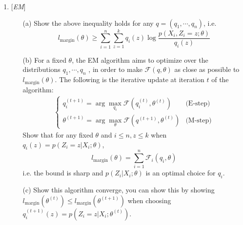 \documentclass[10pt]{article}
\begin{document}
\begin{enumerate}
\item{} {[}\textit{EM}{]}
\begin{itemize}
Let \(Z\) represent the unobserved assignment of a given observation to one of the \(k\) clusters:
\[
Z\sim \text{Categorical}(\pi_1,\cdots,\pi_k)
\]
where \(\pi_k\) is the probability that a randomly selected observation is assigned to cluster \(k\).\\
Let \((X_1, Z_1),\cdots, (X_n, Z_n)\) denote the set of observations and their corresponding cluster assignments, under i.i.d. assumptions.
Consider the marginalized log-likelihood function
\[
l_{\text{margin}}(\theta) = \sum_{i = 1}^n\log p(X_i;\theta) = \sum_{i = 1}^n\log \sum_{j = 1}^kp(X_i,Z_i = j;\theta)
\]
where \(\theta\) is some parameter we want to estimate.
Instead of maximizing the marginalized log-likelihood function, now the EM algorithm aims to maximize a lower bound \(\mathcal F (q,\theta)\) on the marginalized log-likelihood function, such that
\begin{align}\label{in1}
    l_{\text{margin}}(\theta)\geq \mathcal F (q,\theta) = \sum_{i = 1}^n\mathcal{F}_i (q_i,\theta)
\end{align}
where \(\mathcal{F}_i (q_i,\theta) :=\sum_{z = 1}^kq_i(z)\log\frac{p(X_i,Z_i=z;\theta)}{q_i(z)} \). Here \(q_i\) can be seen as an arbitrary distribution over the $k$ clusters for the $i$-th observation.
\item[(a)] Show the above inequality holds for any \(q =(q_1,\cdots, q_n)\), i.e. 
\[    l_{\text{margin}}(\theta)\geq \sum_{i = 1}^n\sum_{z=1}^kq_i(z)\log\frac{p(X_i,Z_i=z;\theta)}{q_i(z)}\]
\item[(b)] For a fixed \(\theta\), the EM algorithm aims to optimize over the distributions $q_1,\cdots, q_n$ , in order to make $\mathcal F (q,\theta)$ as close as
possible to $l_{\text{margin}}(\theta)$. The following is the iterative update at iteration $t$ of the algorithm:
\begin{align*}
    \begin{cases}
        q_i^{(t+1)} = \arg \max_{q_i}\mathcal F (q_i^{(t)},\theta^{(t)}) &\text{(E-step)}\\
        \theta^{(t+1)} = \arg \max_{\theta}\mathcal F (q^{(t+1)},\theta^{(t)}) &\text{(M-step)}
    \end{cases}
\end{align*}
Show that for any fixed \(\theta\) and \(i\leq n,z\leq k\) when $q_i(z) = p(Z_i = z | X_i;\theta)$, 
\[
l_{\text{margin}}(\theta) = \sum_{i = 1}^n\mathcal{F}_i (q_i,\theta)
\]
i.e. the bound is sharp and $p(Z_i|X_i;\theta)$ is an optimal choice for $q_i$. 
\item[(c)] Show this algorithm converge, you can show this by showing \(l_{\text{margin}}(\theta^{(t)})\leq l_{\text{margin}}(\theta^{(t+1)})\) when choosing \(q^{(t+1)}_i(z) = p(Z_i = z | X_i;\theta^{(t)})\). 
\end{itemize}



\end{enumerate}
\end{document}
